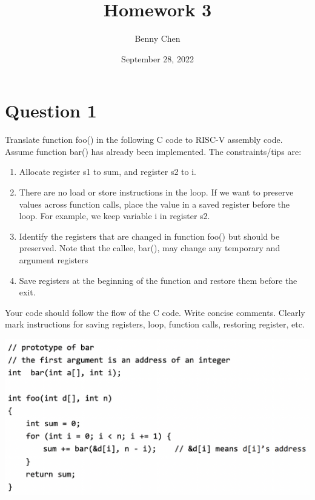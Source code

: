 \documentclass{article}
\title{Homework 3}
\author{Benny Chen}
\date{September 28, 2022}
\begin{document}
\maketitle

\section*{Question 1}
Translate function foo() in the following C code to RISC-V assembly code. Assume function
bar() has already been implemented. The constraints/tips are:
\begin{enumerate}
    \item Allocate register s1 to sum, and register s2 to i.
    \item There are no load or store instructions in the loop. If we want to preserve values across
        function calls, place the value in a saved register before the loop. For example, we keep
        variable i in register s2.
    \item Identify the registers that are changed in function foo() but should be preserved. Note that
        the callee, bar(), may change any temporary and argument registers
    \item Save registers at the beginning of the function and restore them before the exit.    
\end{enumerate}
Your code should follow the flow of the C code. Write concise comments.
Clearly mark instructions for saving registers, loop, function calls, restoring register, etc.

\begin{center}
    \includegraphics[scale=.55]{images/Q1.png}
\end{center}
\end{document}
